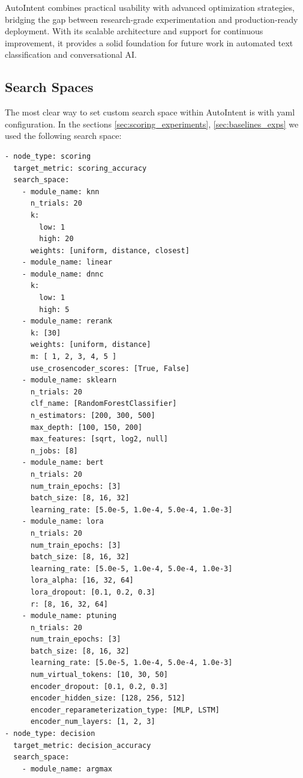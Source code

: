 AutoIntent combines practical usability with advanced optimization strategies, bridging the gap between research-grade experimentation and production-ready deployment. With its scalable architecture and support for continuous improvement, it provides a solid foundation for future work in automated text classification and conversational AI.


  
 

\begin{appendices}

\section{Search Spaces}\label{app:search_spaces}

The most clear way to set custom search space within AutoIntent is with yaml configuration. In the sections \ref{sec:scoring_experiments}, \ref{sec:baselines_exps} we used the following search space:
\begin{verbatim}
- node_type: scoring
  target_metric: scoring_accuracy
  search_space:
    - module_name: knn
      n_trials: 20
      k:
        low: 1
        high: 20
      weights: [uniform, distance, closest]
    - module_name: linear
    - module_name: dnnc
      k:
        low: 1
        high: 5
    - module_name: rerank
      k: [30]
      weights: [uniform, distance]
      m: [ 1, 2, 3, 4, 5 ]
      use_crosencoder_scores: [True, False]
    - module_name: sklearn
      n_trials: 20
      clf_name: [RandomForestClassifier]
      n_estimators: [200, 300, 500]
      max_depth: [100, 150, 200]
      max_features: [sqrt, log2, null]
      n_jobs: [8]
    - module_name: bert
      n_trials: 20
      num_train_epochs: [3]
      batch_size: [8, 16, 32]
      learning_rate: [5.0e-5, 1.0e-4, 5.0e-4, 1.0e-3]
    - module_name: lora
      n_trials: 20
      num_train_epochs: [3]
      batch_size: [8, 16, 32]
      learning_rate: [5.0e-5, 1.0e-4, 5.0e-4, 1.0e-3]
      lora_alpha: [16, 32, 64]
      lora_dropout: [0.1, 0.2, 0.3]
      r: [8, 16, 32, 64]
    - module_name: ptuning
      n_trials: 20
      num_train_epochs: [3]
      batch_size: [8, 16, 32]
      learning_rate: [5.0e-5, 1.0e-4, 5.0e-4, 1.0e-3]
      num_virtual_tokens: [10, 30, 50]
      encoder_dropout: [0.1, 0.2, 0.3]
      encoder_hidden_size: [128, 256, 512]
      encoder_reparameterization_type: [MLP, LSTM]
      encoder_num_layers: [1, 2, 3]
- node_type: decision
  target_metric: decision_accuracy
  search_space:
    - module_name: argmax
\end{verbatim}


\end{appendices}
